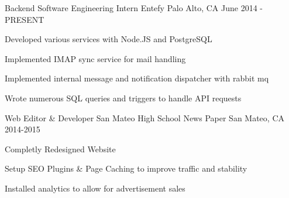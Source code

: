\begin{cventries}
  \cventry
    {Backend Software Engineering Intern}
    {Entefy}
    {Palo Alto, CA}
    {June 2014 - PRESENT}
    {
      \begin{cvitems}
        \item {Developed various services with Node.JS and PostgreSQL}
        \item {Implemented IMAP sync service for mail handling}
        \item {Implemented internal message and notification dispatcher with rabbit mq}
        \item {Wrote numerous SQL queries and triggers to handle API requests}
      \end{cvitems}
    }
  \cventry
    {Web Editor \& Developer}
    {San Mateo High School News Paper}
    {San Mateo, CA}
    {2014-2015}
    {
      \begin{cvitems}
        \item {Completly Redesigned Website}
        \item {Setup SEO Plugins \& Page Caching to improve traffic and stability}
        \item {Installed analytics to allow for advertisement sales}
      \end{cvitems}
    }
\end{cventries}
